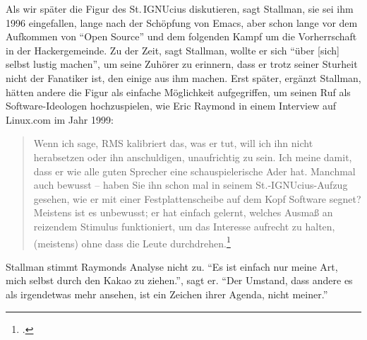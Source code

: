 Als wir später die Figur des St.\,IGNUcius diskutieren, sagt Stallman, sie sei ihm 1996 eingefallen, lange nach der Schöpfung von Emacs, aber schon lange vor dem Aufkommen von "`Open Source"' und dem folgenden Kampf um die Vorherrschaft in der Hackergemeinde. Zu der Zeit, sagt Stallman, wollte er sich "`über [sich] selbst lustig machen"', um seine Zuhörer zu erinnern, dass er trotz seiner Sturheit nicht der Fanatiker ist, den einige aus ihm machen. Erst später, ergänzt Stallman, hätten andere die Figur als einfache Möglichkeit aufgegriffen, um seinen Ruf als Software-Ideologen hochzuspielen, wie Eric Raymond in einem Interview auf Linux.com im Jahr 1999:

\begin{quote}
Wenn ich sage, RMS kalibriert das, was er tut, will ich ihn nicht herabsetzen oder ihn anschuldigen, unaufrichtig zu sein. Ich meine damit, dass er wie alle guten Sprecher eine schauspielerische Ader hat. Manchmal auch bewusst – haben Sie ihn schon mal in seinem St.-IGNUcius-Aufzug gesehen, wie er mit einer Festplattenscheibe auf dem Kopf Software segnet? Meistens ist es unbewusst; er hat einfach gelernt, welches Ausmaß an reizendem Stimulus funktioniert, um das Interesse aufrecht zu halten, (meistens) ohne dass die Leute durchdrehen.\footcite[Vgl.][]{esrint}
\end{quote}

Stallman stimmt Raymonds Analyse nicht zu. "`Es ist einfach nur meine Art, mich selbst durch den Kakao zu ziehen."', sagt er. "`Der Umstand, dass andere es als irgendetwas mehr ansehen, ist ein Zeichen ihrer Agenda, nicht meiner."'

